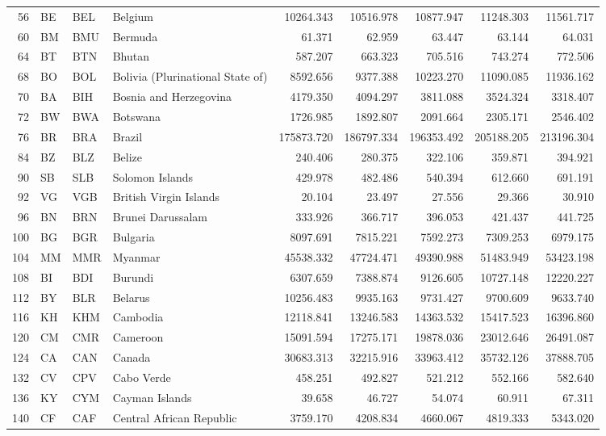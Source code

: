 {\begin{longtable}{rlllrrrrr}
 56 & BE & BEL & Belgium & 10264.343 & 10516.978 & 10877.947 & 11248.303 & 11561.717 \\
 60 & BM & BMU & Bermuda & 61.371 & 62.959 & 63.447 & 63.144 & 64.031 \\
 64 & BT & BTN & Bhutan & 587.207 & 663.323 & 705.516 & 743.274 & 772.506 \\
 68 & BO & BOL & Bolivia (Plurinational State of) & 8592.656 & 9377.388 & 10223.270 & 11090.085 & 11936.162 \\
 70 & BA & BIH & Bosnia and Herzegovina & 4179.350 & 4094.297 & 3811.088 & 3524.324 & 3318.407 \\
 72 & BW & BWA & Botswana & 1726.985 & 1892.807 & 2091.664 & 2305.171 & 2546.402 \\
 76 & BR & BRA & Brazil & 175873.720 & 186797.334 & 196353.492 & 205188.205 & 213196.304 \\
 84 & BZ & BLZ & Belize & 240.406 & 280.375 & 322.106 & 359.871 & 394.921 \\
 90 & SB & SLB & Solomon Islands & 429.978 & 482.486 & 540.394 & 612.660 & 691.191 \\
 92 & VG & VGB & British Virgin Islands & 20.104 & 23.497 & 27.556 & 29.366 & 30.910 \\
 96 & BN & BRN & Brunei Darussalam & 333.926 & 366.717 & 396.053 & 421.437 & 441.725 \\
 100 & BG & BGR & Bulgaria & 8097.691 & 7815.221 & 7592.273 & 7309.253 & 6979.175 \\
 104 & MM & MMR & Myanmar & 45538.332 & 47724.471 & 49390.988 & 51483.949 & 53423.198 \\
 108 & BI & BDI & Burundi & 6307.659 & 7388.874 & 9126.605 & 10727.148 & 12220.227 \\
 112 & BY & BLR & Belarus & 10256.483 & 9935.163 & 9731.427 & 9700.609 & 9633.740 \\
 116 & KH & KHM & Cambodia & 12118.841 & 13246.583 & 14363.532 & 15417.523 & 16396.860 \\
 120 & CM & CMR & Cameroon & 15091.594 & 17275.171 & 19878.036 & 23012.646 & 26491.087 \\
 124 & CA & CAN & Canada & 30683.313 & 32215.916 & 33963.412 & 35732.126 & 37888.705 \\
 132 & CV & CPV & Cabo Verde & 458.251 & 492.827 & 521.212 & 552.166 & 582.640 \\
 136 & KY & CYM & Cayman Islands & 39.658 & 46.727 & 54.074 & 60.911 & 67.311 \\
 140 & CF & CAF & Central African Republic & 3759.170 & 4208.834 & 4660.067 & 4819.333 & 5343.020 \\

\end{longtable}}
